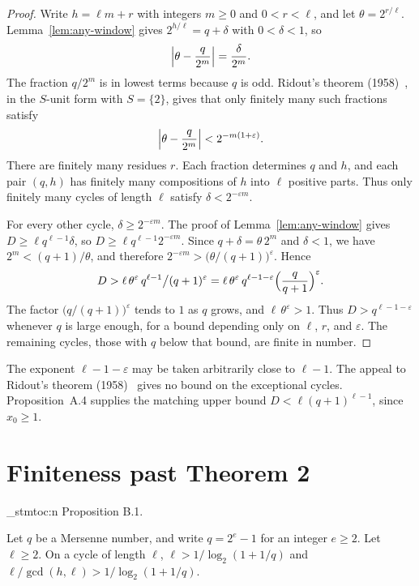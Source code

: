 \documentclass[11pt]{article}
\newenvironment{named}[1]{%
  \par\addvspace{\medskipamount}%
  \pagebreak[3]%
  \noindent{\bfseries #1}\space\ignorespaces
  \stmtoc{#1}%
}{\par\addvspace{\medskipamount}}
\newcommand{\stmtoc}[1]{ \qn_stmtoc:n {#1} }
\begin{document}
\begin{proof}
Write $h = \ell m + r$ with integers $m \ge 0$ and $0 < r < \ell$, and let $\theta = 2^{r/\ell}$.
Lemma~\ref{lem:any-window} gives $2^{h/\ell} = q + \delta$ with $0 < \delta < 1$, so
\[
\Bigl| \theta - \frac{q}{2^m} \Bigr| = \frac{\delta}{2^m}.
\]
The fraction $q/2^m$ is in lowest terms because $q$ is odd.
Ridout's theorem (1958)~\cite{ridout}, in the $S$-unit form with $S = \{2\}$, gives that only finitely many such fractions satisfy
\[
\Bigl| \theta - \frac{q}{2^m} \Bigr| < 2^{-m(1+\varepsilon)}.
\]
There are finitely many residues $r$.
Each fraction determines $q$ and $h$, and each pair $(q, h)$ has finitely many compositions of $h$ into $\ell$ positive parts.
Thus only finitely many cycles of length $\ell$ satisfy $\delta < 2^{-\varepsilon m}$.

For every other cycle, $\delta \ge 2^{-\varepsilon m}$.
The proof of Lemma~\ref{lem:any-window} gives $D \ge \ell q^{\ell-1}\delta$, so $D \ge \ell q^{\ell-1} 2^{-\varepsilon m}$.
Since $q + \delta = \theta\, 2^m$ and $\delta < 1$, we have $2^m < (q+1)/\theta$, and therefore $2^{-\varepsilon m} > \bigl(\theta/(q+1)\bigr)^\varepsilon$.
Hence
\[
D > \ell\, \theta^\varepsilon\, q^{\ell-1} \big/ (q+1)^\varepsilon = \ell\, \theta^\varepsilon\, q^{\ell-1-\varepsilon} \Bigl(\frac{q}{q+1}\Bigr)^\varepsilon.
\]
The factor $\bigl(q/(q+1)\bigr)^\varepsilon$ tends to $1$ as $q$ grows, and $\ell\, \theta^\varepsilon > 1$.
Thus $D > q^{\ell-1-\varepsilon}$ whenever $q$ is large enough, for a bound depending only on $\ell$, $r$, and $\varepsilon$.
The remaining cycles, those with $q$ below that bound, are finite in number.
\end{proof}

The exponent $\ell - 1 - \varepsilon$ may be taken arbitrarily close to $\ell - 1$.
The appeal to Ridout's theorem (1958)~\cite{ridout} gives no bound on the exceptional cycles.
Proposition~A.4 supplies the matching upper bound $D < \ell(q+1)^{\ell-1}$, since $x_0 \ge 1$.

\section{Finiteness past Theorem 2}
\label{app:narrow}

\begin{named}{Proposition B.1.}
Let $q$ be a Mersenne number, and write $q = 2^e - 1$ for an integer $e \ge 2$.
Let $\ell \ge 2$.
On a cycle of length $\ell$, $\ell > 1/\log_2(1+1/q)$ and $\ell/\gcd(h,\ell) > 1/\log_2(1+1/q)$.
\end{named}
\end{document}
